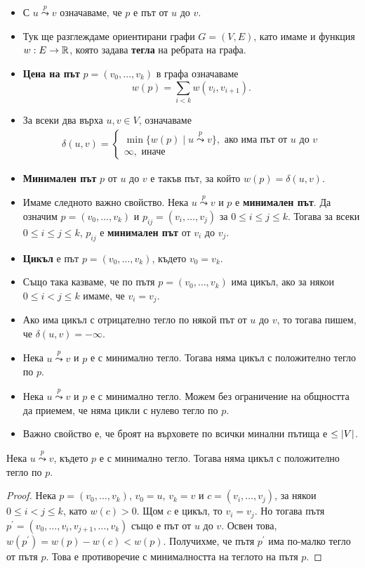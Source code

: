 \begin{itemize}
\item
  С $u \stackrel{p}{\leadsto} v$ означаваме, че $p$ е път от $u$ до $v$.
\item
  Тук ще разглеждаме ориентирани графи $G = (V,E)$, като имаме и 
  функция $w: E\to \mathbb{R}$, която задава {\bf тегла} на ребрата на графа.
\item 
  {\bf Цена на път} $p = (v_0,\dots,v_k)$ в графа означаваме 
  \[w(p) = \sum_{i<k} w(v_i,v_{i+1}).\]
\item
  За всеки два върха $u,v \in V$, означаваме
  \begin{align*}
    \delta(u,v) = 
    \begin{cases}
      \min\{w(p)\mid u \stackrel{p}{\leadsto} v\}, \mbox{ ако има път от }u\mbox{ до }v\\
      \infty, \mbox{ иначе }
    \end{cases}
  \end{align*}
\item
  {\bf Минимален път} $p$ от $u$ до $v$ е такъв път, за който $w(p) = \delta(u,v)$.
\item
  Имаме следното важно свойство.
  Нека $u \stackrel{p}{\leadsto} v$ и $p$ е {\bf минимален път}.
  Да означим $p = (v_0,\dots,v_k)$ и $p_{ij} = (v_i,\dots,v_j)$ за $0\leq i \leq j \leq k$.
  Тогава за всеки $0\leq i \leq j \leq k$, 
  $p_{ij}$ е {\bf минимален път} от $v_i$ до $v_j$.
\item
  {\bf Цикъл} е път $p = (v_0,\dots,v_k)$, където $v_0 = v_k$.
\item
  Също така казваме, че по пътя $p = (v_0,\dots,v_k)$ има цикъл, ако
  за някои $0 \leq i < j \leq k$ имаме, че $v_i = v_j$.
\item
  Ако има цикъл с отрицателно тегло по някой път от $u$ до $v$, то 
  тогава пишем, че $\delta(u,v) = -\infty$.
\item
  Нека $u \stackrel{p}{\leadsto} v$ и $p$ е с минимално тегло.
  Тогава няма цикъл с положително тегло по $p$.
\item
  Нека $u \stackrel{p}{\leadsto} v$ и $p$ е с минимално тегло.
  Можем без ограничение на общността да приемем, че няма цикли с нулево тегло
  по $p$.
\item
  Важно свойство е, че броят на върховете по всички минални пътища е $\leq \vert{V}\vert$.
\end{itemize}

\begin{prop}
  Нека $u \stackrel{p}{\leadsto} v$, където $p$ е с минимално тегло.
  Тогава няма цикъл с положително тегло по $p$.
\end{prop}
\begin{proof}
  Нека $p = (v_0,\dots,v_k)$, $v_0 = u$, $v_k = v$ и 
  $c = (v_i,\dots,v_j)$, за някои $0 \leq i < j \leq k$, 
  като $w(c) > 0$. Щом $c$ е цикъл, то $v_i = v_j$.
  Но тогава пътя $p^\prime = (v_0,\dots,v_i,v_{j+1},\dots,v_k)$ също е път от $u$ до $v$.
  Освен това, $w(p^\prime) = w(p) - w(c) < w(p)$.
  Получихме, че пътя $p^\prime$ има по-малко тегло от пътя $p$.
  Това е противоречие с минималността на теглото на пътя $p$.
\end{proof}




